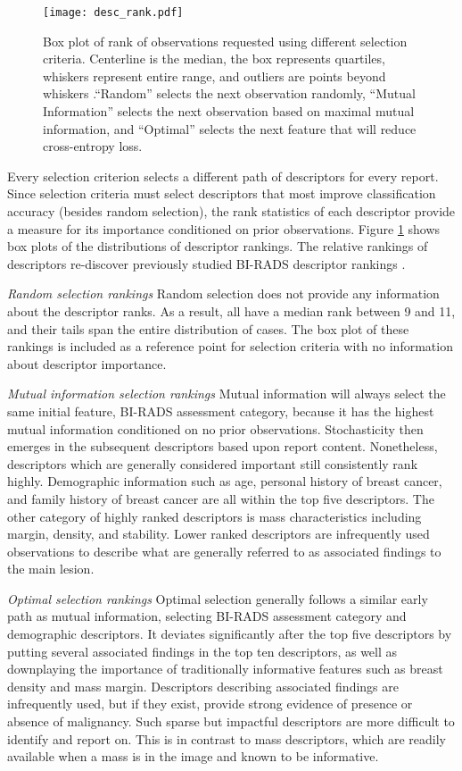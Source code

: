\begin{figure}[h]
	\centering
	\texttt{[image: desc\_rank.pdf]}
	\caption[Ranking descriptor importance with selection criteria]{Box plot of rank of observations requested using different selection criteria. Centerline is the median, the box represents quartiles, whiskers represent entire range, and outliers are points beyond whiskers .``Random'' selects the next observation randomly, ``Mutual Information'' selects the next observation based on maximal mutual information, and ``Optimal'' selects the next feature that will reduce cross-entropy loss.}
	\label{fig:feedback_mammo_ranks}
\end{figure}

Every selection criterion selects a different path of descriptors for every report.
Since selection criteria must select descriptors that most improve classification accuracy (besides random selection), the rank statistics of each descriptor provide a measure for its importance conditioned on prior observations.
Figure \ref{fig:feedback_mammo_ranks} shows box plots of the distributions of descriptor rankings.
The relative rankings of descriptors re-discover previously studied BI-RADS descriptor rankings \cite{Wu:2013bx}.


\emph{Random selection rankings}
Random selection does not provide any information about the descriptor ranks.
As a result, all have a median rank between 9 and 11, and their tails span the entire distribution of cases.
The box plot of these rankings is included as a reference point for selection criteria with no information about descriptor importance.

\emph{Mutual information selection rankings}
Mutual information will always select the same initial feature, BI-RADS assessment category, because it has the highest mutual information conditioned on no prior observations.
Stochasticity then emerges in the subsequent descriptors based upon report content.
Nonetheless, descriptors which are generally considered important still consistently rank highly.
Demographic information such as age, personal history of breast cancer, and family history of breast cancer are all within the top five descriptors.
The other category of highly ranked descriptors is mass characteristics including margin, density, and stability.
Lower ranked descriptors are infrequently used observations to describe what are generally referred to as associated findings to the main lesion.

\emph{Optimal selection rankings}
Optimal selection generally follows a similar early path as mutual information, selecting BI-RADS assessment category and demographic descriptors.
It deviates significantly after the top five descriptors by putting several associated findings in the top ten descriptors, as well as downplaying the importance of traditionally informative features such as breast density and mass margin.
Descriptors describing associated findings are infrequently used, but if they exist, provide strong evidence of presence or absence of malignancy.
Such sparse but impactful descriptors are more difficult to identify and report on.
This is in contrast to mass descriptors, which are readily available when a mass is in the image and known to be informative.

